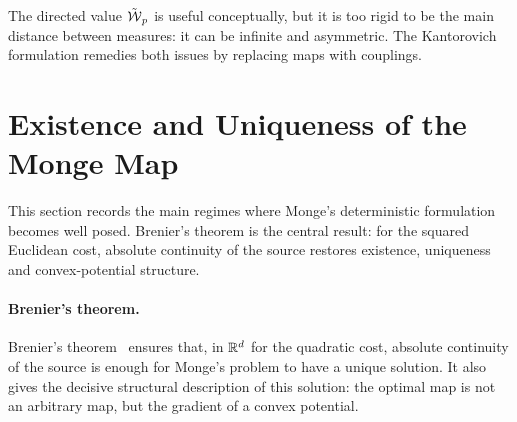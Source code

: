 The directed value $\tilde{\operatorname{\mathcal{W}}}_p$ is useful conceptually, but it is too rigid to be the main distance between measures: it can be infinite and asymmetric. The Kantorovich formulation remedies both issues by replacing maps with couplings.

\section{Existence and Uniqueness of the Monge Map}
\label{sec-monge-existence-uniqueness}

This section records the main regimes where Monge's deterministic formulation becomes well posed. Brenier's theorem is the central result: for the squared Euclidean cost, absolute continuity of the source restores existence, uniqueness and convex-potential structure.

\paragraph{Brenier's theorem.}

Brenier's theorem~\cite{MR923203,Brenier91} ensures that, in $\mathbb{R}^d$ for the quadratic cost, absolute continuity of the source is enough for Monge's problem to have a unique solution. It also gives the decisive structural description of this solution: the optimal map is not an arbitrary map, but the gradient of a convex potential.

